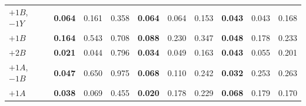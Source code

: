 \begin{table}[htbp]
\begin{tabular}{l rrr rrr rrr}
$+1B$, $-1Y$ & \textbf{0.064} & 0.161 & 0.358 & \textbf{0.064} & 0.064 & 0.153 & \textbf{0.043} & 0.043 & 0.168 \\
$+1B$ & \textbf{0.164} & 0.543 & 0.708 & \textbf{0.088} & 0.230 & 0.347 & \textbf{0.048} & 0.178 & 0.233 \\
$+2B$ & \textbf{0.021} & 0.044 & 0.796 & \textbf{0.034} & 0.049 & 0.163 & \textbf{0.043} & 0.055 & 0.201 \\
$+1A$, $-1B$ & \textbf{0.047} & 0.650 & 0.975 & \textbf{0.068} & 0.110 & 0.242 & \textbf{0.032} & 0.253 & 0.263 \\
$+1A$ & \textbf{0.038} & 0.069 & 0.455 & \textbf{0.020} & 0.178 & 0.229 & \textbf{0.068} & 0.179 & 0.170 \\
\bottomrule
\end{tabular}
\end{table}